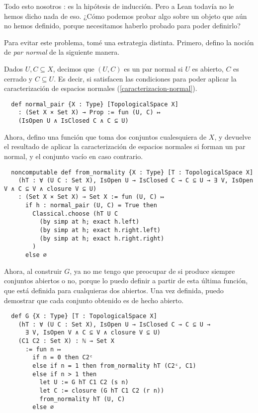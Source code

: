 Todo esto nosotros : es la hipótesis de inducción. Pero a Lean todavía no le hemos dicho nada de eso. ¿Cómo podemos probar algo sobre un objeto que aún no hemos definido, porque necesitamos haberlo probado para poder definirlo?

Para evitar este problema, tomé una estrategia distinta. Primero, defino la noción de \textit{par normal} de la siguiente manera.

\begin{definition}
  Dados $U, C \subseteq X$, decimos que $(U, C)$ es un \textnormal{par normal} si $U$ es abierto, $C$ es cerrado y $C \subseteq U$. Es decir, si satisfacen las condiciones para poder aplicar la caracterización de espacios normales (\ref{caracterizacion-normal}).
\end{definition}

\begin{lstlisting}
  def normal_pair {X : Type} [TopologicalSpace X]
    : (Set X × Set X) → Prop := fun (U, C) ↦
    (IsOpen U ∧ IsClosed C ∧ C ⊆ U)
\end{lstlisting}

Ahora, defino una función  que toma dos conjuntos cualesquiera de $X$, y devuelve el resultado de aplicar la caracterización de espacios normales si forman un par normal, y el conjunto vacío en caso contrario.

\begin{lstlisting}
  noncomputable def from_normality {X : Type} [T : TopologicalSpace X]
    (hT : ∀ (U C : Set X), IsOpen U → IsClosed C → C ⊆ U → ∃ V, IsOpen V ∧ C ⊆ V ∧ closure V ⊆ U)
    : (Set X × Set X) → Set X := fun (U, C) ↦
      if h : normal_pair (U, C) = True then
        Classical.choose (hT U C
          (by simp at h; exact h.left)
          (by simp at h; exact h.right.left)
          (by simp at h; exact h.right.right)
        )
      else ∅
\end{lstlisting}

Ahora, al construir $G$, ya no me tengo que preocupar de si produce siempre conjuntos abiertos o no, porque lo puedo definir a partir de esta última función, que está definida para cualquieras dos abiertos. Una vez definida, puedo demostrar que cada conjunto obtenido es de hecho abierto.

\begin{lstlisting}
  def G {X : Type} [T : TopologicalSpace X]
    (hT : ∀ (U C : Set X), IsOpen U → IsClosed C → C ⊆ U →
      ∃ V, IsOpen V ∧ C ⊆ V ∧ closure V ⊆ U)
    (C1 C2 : Set X) : ℕ → Set X
      := fun n ↦
        if n = 0 then C2ᶜ
        else if n = 1 then from_normality hT (C2ᶜ, C1)
        else if n > 1 then
          let U := G hT C1 C2 (s n)
          let C := closure (G hT C1 C2 (r n))
          from_normality hT (U, C)
        else ∅
\end{lstlisting}

